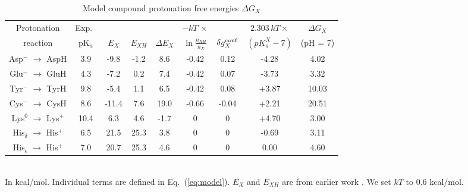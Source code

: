 \documentclass[a4paper,12pt]{article}
\newcommand{\pk}{pK$_a$}
\begin{document}
\begin{table}
\caption{Model compound protonation free energies $\Delta G_X$}
\label{tab:models}
\begin{center}
\begin{tabular}{ccccccccc} \hline
Protonation & Exp.\ &       &         &              &     $-kT \, \times$   &             & $2.303 \, kT \times$ & $\Delta G_X$ \\
reaction   & \pk   & $E_X$ & $E_{XH}$ & $\Delta E_X$ & $\ln \frac{n_{XH}}{n_X}$ & $\delta g_X^{\rm conf}$ & $(pK_a^X - 7)$ & (pH = 7) \\
\hline
Asp$^-$ $\rightarrow$ AspH           & 3.9  & -9.8  & -1.2 &   8.6    & -0.42 & 0.12  & -4.28  &  4.02  \\
Glu$^-$ $\rightarrow$ GluH           & 4.3  & -7.2  & 0.2  &   7.4    & -0.42 & 0.07  & -3.73  &  3.32  \\
Tyr$^-$ $\rightarrow$ TyrH           & 9.8  & -5.4  & 1.1  &   6.5    & -0.42 & 0.08  & +3.87  & 10.03  \\
Cys$^-$ $\rightarrow$ CysH           & 8.6  & -11.4 & 7.6  &  19.0    & -0.66 & -0.04 & +2.21  & 20.51  \\
Lys$^0$ $\rightarrow$ Lys$^+$        & 10.4 &  6.3  & 4.6  &  -1.7    &  0    & 0     & +4.70  &  3.00  \\
His$_{\delta}$ $\rightarrow$ His$^+$  & 6.5  & 21.5  & 25.3  &  3.8     &  0    & 0     & -0.69  & 3.11   \\
His$_{\epsilon}$ $\rightarrow$ His$^+$ & 7.0  & 20.7  & 25.3 &   4.6    &  0    & 0     & 0.00   &  4.60  \\ \hline 
\end{tabular}
\\ {\footnotesize \noindent In kcal/mol. Individual terms are defined in Eq.\ (\ref{eq:model}).
  $E_X$ and $E_{XH}$ are from earlier work \cite{Polydorides13}. We set $kT$ to 0.6 kcal/mol.}
\end{center}
\end{table}
\end{document}
